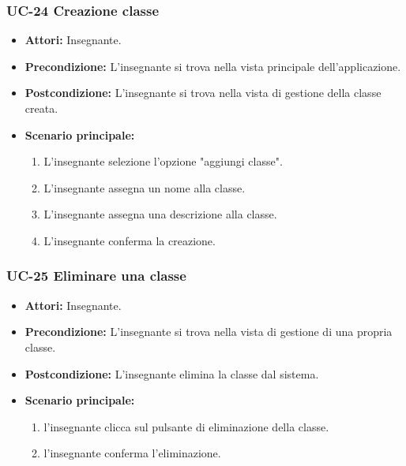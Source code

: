 \subsubsection{UC-24 Creazione classe}
\begin{itemize}
	\item \textbf{Attori:} Insegnante.
	\item \textbf{Precondizione:} L'insegnante si trova nella vista principale dell'applicazione.
	\item \textbf{Postcondizione:} L'insegnante si trova nella vista di gestione della classe creata.
	\item \textbf{Scenario principale:}
	\begin{enumerate}
		\item L'insegnante selezione l'opzione "aggiungi classe".
		\item L'insegnante assegna un nome alla classe.
		\item L'insegnante assegna una descrizione alla classe.
		\item L'insegnante conferma la creazione.
	\end{enumerate}
\end{itemize}

\subsubsection{UC-25 Eliminare una classe}
\begin{itemize}
	\item \textbf{Attori:} Insegnante.
	\item \textbf{Precondizione:} L'insegnante si trova nella vista di gestione di una propria classe.
	\item \textbf{Postcondizione:} L'insegnante elimina la classe dal sistema.
	\item \textbf{Scenario principale:}
	\begin{enumerate}
		\item l'insegnante clicca sul pulsante di eliminazione della classe.
		\item l'insegnante conferma l'eliminazione.
	\end{enumerate}
\end{itemize}

